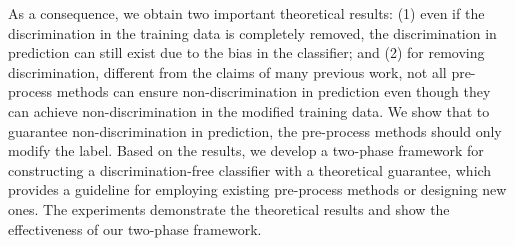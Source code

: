 \documentclass{article}
\begin{document}
As a consequence, we obtain two important theoretical results: (1) even if the discrimination in the training data is completely removed, the discrimination in prediction can still exist due to the bias in the classifier; and (2) for removing discrimination, different from the claims of many previous work, not all pre-process methods can ensure non-discrimination in prediction even though they can achieve non-discrimination in the modified training data. We show that to guarantee non-discrimination in prediction, the pre-process methods should only modify the label.
Based on the results, we develop a two-phase framework for constructing a discrimination-free classifier with a theoretical guarantee, which provides a guideline for employing existing pre-process methods or designing new ones. The experiments demonstrate the theoretical results and show the effectiveness of our two-phase framework.


\end{document}
